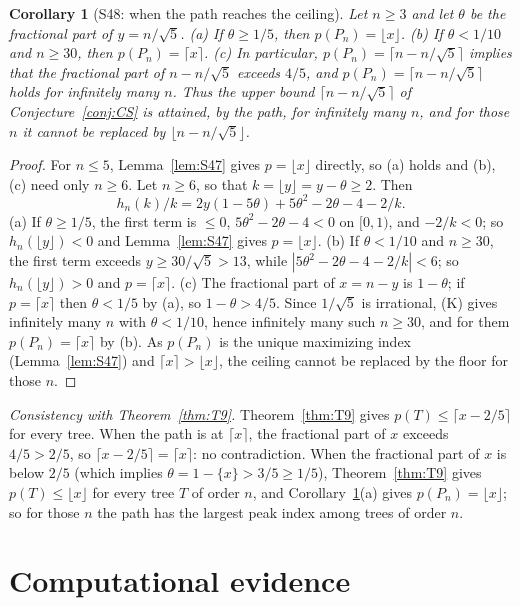 \documentclass[11pt]{amsart}
\newtheorem{corollary}[theorem]{Corollary}
\theoremstyle{definition}
\theoremstyle{remark}
\newcommand{\frc}[1]{\{#1\}}
\begin{document}
\begin{corollary}[S48: when the path reaches the ceiling]\label{cor:S48}
Let $n\ge3$ and let $\theta$ be the fractional part of $y=n/\sqrt5$.
(a) If $\theta\ge1/5$, then $p(P_n)=\lfloor x\rfloor$. (b) If $\theta<1/10$ and
$n\ge30$, then $p(P_n)=\lceil x\rceil$. (c) In particular,
$p(P_n)=\lceil n-n/\sqrt5\rceil$ implies that the fractional part of
$n-n/\sqrt5$ exceeds $4/5$, and $p(P_n)=\lceil n-n/\sqrt5\rceil$ holds for
infinitely many $n$. Thus the upper bound $\lceil n-n/\sqrt5\rceil$ of
Conjecture~\ref{conj:CS} is attained, by the path, for infinitely many $n$,
and for those $n$ it cannot be replaced by $\lfloor n-n/\sqrt5\rfloor$.
\end{corollary}

\begin{proof}
For $n\le5$, Lemma~\ref{lem:S47} gives $p=\lfloor x\rfloor$ directly, so (a)
holds and (b), (c) need only $n\ge6$. Let $n\ge6$, so that
$k=\lfloor y\rfloor=y-\theta\ge2$. Then
\[
h_n(k)/k=2y(1-5\theta)+5\theta^2-2\theta-4-2/k .
\]
(a) If $\theta\ge1/5$, the first term is $\le0$, $5\theta^2-2\theta-4<0$ on
$[0,1)$, and $-2/k<0$; so $h_n(\lfloor y\rfloor)<0$ and Lemma~\ref{lem:S47}
gives $p=\lfloor x\rfloor$. (b) If $\theta<1/10$ and $n\ge30$, the first term
exceeds $y\ge30/\sqrt5>13$, while $|5\theta^2-2\theta-4-2/k|<6$; so
$h_n(\lfloor y\rfloor)>0$ and $p=\lceil x\rceil$. (c) The fractional part of
$x=n-y$ is $1-\theta$; if $p=\lceil x\rceil$ then $\theta<1/5$ by (a), so
$1-\theta>4/5$. Since $1/\sqrt5$ is irrational, (K) gives infinitely many
$n$ with $\theta<1/10$, hence infinitely many such $n\ge30$, and for them
$p(P_n)=\lceil x\rceil$ by (b). As $p(P_n)$ is the unique maximizing index
(Lemma~\ref{lem:S47}) and $\lceil x\rceil>\lfloor x\rfloor$, the ceiling cannot
be replaced by the floor for those $n$.
\end{proof}

\emph{Consistency with Theorem~\ref{thm:T9}.} Theorem~\ref{thm:T9} gives
$p(T)\le\lceil x-2/5\rceil$ for every tree. When the path is at $\lceil x\rceil$,
the fractional part of $x$ exceeds $4/5>2/5$, so
$\lceil x-2/5\rceil=\lceil x\rceil$: no contradiction. When the fractional
part of $x$ is below $2/5$ (which implies $\theta=1-\frc{x}>3/5\ge1/5$),
Theorem~\ref{thm:T9} gives $p(T)\le\lfloor x\rfloor$ for every tree $T$ of
order $n$, and Corollary~\ref{cor:S48}(a) gives $p(P_n)=\lfloor x\rfloor$; so
for those $n$ the path has the largest peak index among trees of order $n$.

\section{Computational evidence}\label{sec:comp}
\end{document}
